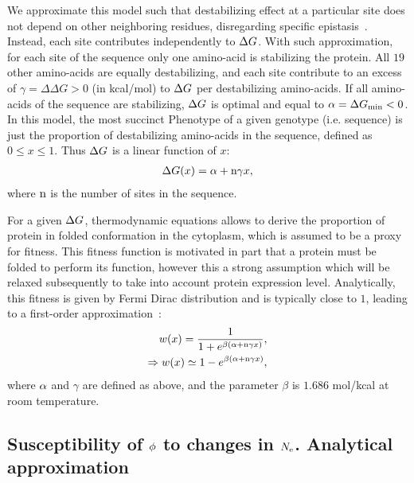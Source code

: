 We approximate this model such that destabilizing effect at a particular site does not depend on other neighboring residues, disregarding specific epistasis~\citep{Dasmeh2014}.
Instead, each site contributes independently to $\Delta G$.
With such approximation, for each site of the sequence only one amino-acid is stabilizing the protein.
All $19$ other amino-acids are equally destabilizing, and each site contribute to an excess of $\gamma = \Delta \Delta G > 0$ (in kcal/mol) to $\Delta G$ per destabilizing amino-acids.
If all amino-acids of the sequence are stabilizing, $\Delta G$ is optimal and equal to $ \alpha = \Delta G_{\text{min}} < 0$.
In this model, the most succinct \gls{Phenotype} of a given genotype (i.e. sequence) is just the proportion of destabilizing amino-acids in the sequence, defined as $0 \leq x \leq 1$.
Thus $\Delta G$ is a linear function of $x$:
\begin{align}
    \Delta G (x) = \alpha + \text{n} \gamma x,
\end{align}
where $\text{n}$ is the number of sites in the sequence.

For a given $\Delta G$, thermodynamic equations allows to derive the proportion of protein in folded conformation in the cytoplasm, which is assumed to be a proxy for fitness.
This fitness function is motivated in part that a protein must be folded to perform its function, however this a strong assumption which will be relaxed subsequently to take into account protein expression level.
Analytically, this fitness is given by Fermi Dirac distribution and is typically close to $1$, leading to a first-order approximation~\citep{Goldstein2011}:
\begin{align}
    w (x) = \dfrac{1}{1 + e^{\beta (\alpha + \text{n} \gamma x)}},\\
    \Rightarrow w (x) \simeq 1 - e^{\beta (\alpha + \text{n} \gamma x)},
\end{align}
where $\alpha$ and $\gamma$ are defined as above, and the parameter $\beta$ is $1.686$ mol/kcal at room temperature.

\subsection{Susceptibility of \texorpdfstring{$\phi$}{φ} to changes in \texorpdfstring{$N_{\mathrm{e}}$}{Nₑ}. Analytical approximation}


